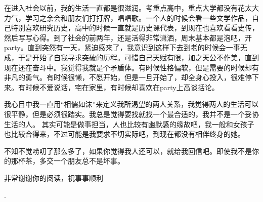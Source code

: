 \documentclass[10pt,letterpaper]{article}
\def\name{Xi He}
\def\footerlink{}
\begin{document}
\begin{CJK}{UTF8}{gbsn}
在进入社会以前，我的生活一直都是很滋润。考重点高中，重点大学都没有花太大力气，学习之余会和朋友们打打牌，唱唱歌。一个人的时候会看一些文学作品，自己特别喜欢研究历史，高中的时候一直就是历史课代表，到现在也喜欢看看史传，然后写写心得。到了社会的前两年，还是活得非常潇洒，周末基本都是泡吧，开party。直到突然有一天，紧迫感来了，我意识到这样下去到老的时候会一事无成，于是开始了自我寻求突破的历程。可惜自己天赋有限，加之天公不作美，直到现在还在奋斗中。我觉得我就是个矛盾体。有时候性格偏软，但是需要的时候却有非凡的勇气。有时候很懒，不愿开始，但是一旦开始了，却全身心投入，很难停下来。有时候不爱说话，宅在家里，有时候却喜欢在party上高谈括论。

我心目中我一直用“相儒如沫”来定义我所渴望的两人关系，我觉得两人的生活可以很平静，但是必须很踏实。我总是觉得要找就找一个最合适的，我并不是一个妥协生活的人。
其实可能是做事担当，人也比较有幽默感的缘故吧，我一般和女孩子也比较合得来，不过可能是我要求不切实际吧，到现在都没有相伴终身的她。

不知不觉唠叨了那么多了，如果你觉得我人还可以，就给我回信吧。即使我不是你的那杯茶，多交一个朋友总不是坏事。

非常谢谢你的阅读，祝事事顺利


.






\end{CJK} 
\end{document}
